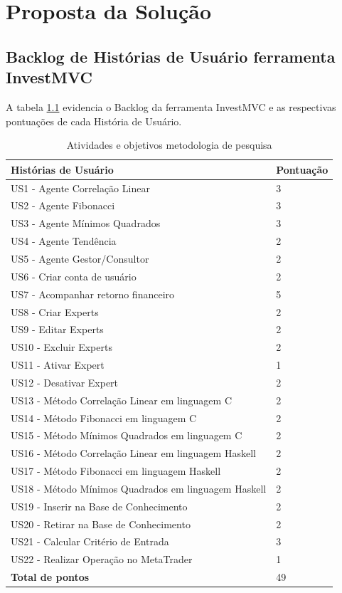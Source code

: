 \chapter{Proposta da Solução}

\section{Backlog de Histórias de Usuário ferramenta InvestMVC}

A tabela \ref{backlog} evidencia o Backlog da ferramenta InvestMVC e as respectivas pontuações de cada História de Usuário.

\begin{table}[htp]
\caption{Atividades e objetivos metodologia de pesquisa}
\begin{center}
    \begin{tabular}{ | p{9cm} | p{5cm} |}
    \hline
    \textbf{Histórias de Usuário} & \textbf{Pontuação} \\ \hline

US1 - Agente Correlação Linear & 3\\ \hline
US2 - Agente Fibonacci & 3 \\ \hline
US3 - Agente Mínimos Quadrados & 3\\ \hline
US4 -  Agente Tendência & 2 \\ \hline
US5 - Agente Gestor/Consultor & 2\\ \hline
US6 - Criar conta de usuário & 2\\ \hline
US7 - Acompanhar retorno financeiro & 5\\ \hline
US8 - Criar Experts & 2\\ \hline
US9 - Editar Experts & 2\\ \hline
US10 - Excluir Experts & 2\\ \hline
US11 - Ativar Expert & 1\\ \hline
US12 - Desativar Expert & 2 \\ \hline
US13 - Método Correlação Linear em linguagem C & 2\\ \hline
US14 - Método Fibonacci em linguagem C & 2\\ \hline
US15 - Método Mínimos Quadrados em linguagem C & 2\\ \hline
US16 - Método Correlação Linear em linguagem Haskell & 2\\ \hline
US17 - Método Fibonacci em linguagem Haskell & 2\\ \hline
US18 - Método Mínimos Quadrados em linguagem Haskell & 2\\ \hline
US19 - Inserir na Base de Conhecimento & 2\\ \hline
US20 - Retirar na Base de Conhecimento & 2\\ \hline
US21 - Calcular Critério de Entrada & 3\\ \hline
US22 - Realizar Operação no MetaTrader& 1\\ \hline
\textbf{Total de pontos} & 49\\ \hline
\end{tabular}
\end{center}
\label{backlog}
\end{table}

